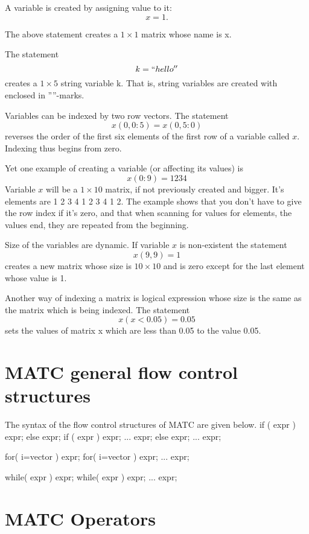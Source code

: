 A variable is created by assigning value to it: 
\[
  x = 1. 
\]
 
The above statement creates a $1 \times 1$ matrix whose name is x. 

The statement 
\[
  k = ``hello''
\]
 creates a $1 \times 5$ string variable k. That is, string variables are created with enclosed in ''''-marks. 

Variables can be indexed by two row vectors. The statement 
\[
   x(0,0:5) = x(0,5:0)
\]
reverses the order of the first six elements of the first row of a variable called $x$. 
Indexing thus begins from zero. 

Yet one example of creating a variable (or affecting its values) is 
\[
  x(0:9) = 1 2 3 4
\]
 Variable $x$ will be a $1 \times 10$ matrix, if not previously created and bigger. 
It's elements are 1 2 3 4 1 2 3 4 1 2.
The example shows that you don't have to give the row index if it's zero, and that when scanning for values for elements, the values end, they are repeated from the beginning. 

Size of the variables are dynamic. If variable $x$ is non-existent the statement 
\[
  x(9,9) = 1
\]
creates a new matrix whose size is $10 \times 10$ and is zero except for the last element whose value is 1. 

Another way of indexing a matrix is logical expression whose size is the same as the matrix which is being indexed. The statement 
\[
  x(x < 0.05) = 0.05
\]
sets the values of matrix x which are less than 0.05 to the value 0.05. 



\section{MATC general flow control structures}

The syntax of the flow control structures of MATC are given below. 
\ttbegin
if ( expr ) expr; else expr;
if ( expr )
{
    expr;
    ...
    expr;
} else {
    expr;
    ...
    expr;
}

for( i=vector ) expr;
for( i=vector )
{
    expr;
    ...
    expr;
}

while( expr ) expr;
while( expr )
{
    expr;
    ...
    expr;
}
\ttend



\section{MATC Operators}

